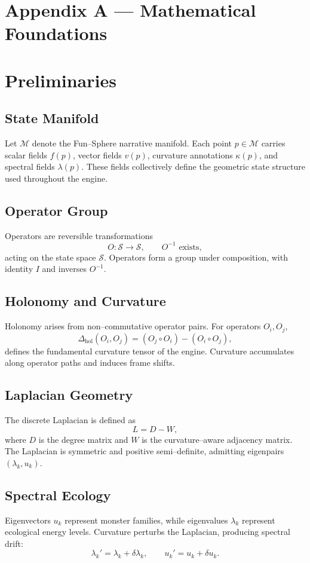 \appendix
\section*{Appendix A — Mathematical Foundations}

\section{Preliminaries}

\subsection{State Manifold}
Let $\mathcal{M}$ denote the Fun–Sphere narrative manifold. Each point
$p \in \mathcal{M}$ carries scalar fields $f(p)$, vector fields $v(p)$,
curvature annotations $\kappa(p)$, and spectral fields $\lambda(p)$.
These fields collectively define the geometric state structure used
throughout the engine.

\subsection{Operator Group}
Operators are reversible transformations
\[
O : \mathcal{S} \rightarrow \mathcal{S},
\qquad
O^{-1} \text{ exists},
\]
acting on the state space $\mathcal{S}$. Operators form a group under
composition, with identity $I$ and inverses $O^{-1}$.

\subsection{Holonomy and Curvature}
Holonomy arises from non–commutative operator pairs. For operators
$O_i, O_j$,
\[
\Delta_{\mathrm{hol}}(O_i, O_j)
    = (O_j \circ O_i) - (O_i \circ O_j),
\]
defines the fundamental curvature tensor of the engine. Curvature
accumulates along operator paths and induces frame shifts.

\subsection{Laplacian Geometry}
The discrete Laplacian is defined as
\[
L = D - W,
\]
where $D$ is the degree matrix and $W$ is the curvature–aware adjacency
matrix. The Laplacian is symmetric and positive semi–definite, admitting
eigenpairs $(\lambda_k, u_k)$.

\subsection{Spectral Ecology}
Eigenvectors $u_k$ represent monster families, while eigenvalues
$\lambda_k$ represent ecological energy levels. Curvature perturbs the
Laplacian, producing spectral drift:
\[
\lambda_k' = \lambda_k + \delta \lambda_k,
\qquad
u_k' = u_k + \delta u_k.
\]

